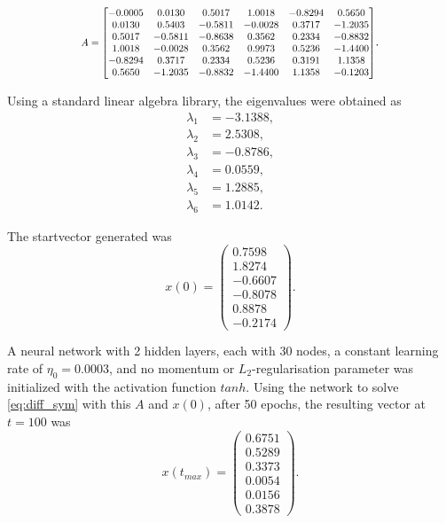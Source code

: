 \documentclass[multicolumn, 10pt]{extarticle}
\begin{document}
\newcommand\scalemath[2]{\scalebox{#1}{\mbox{\ensuremath{\displaystyle #2}}}}

\begin{equation*}
	\scalemath{0.8}{
		A = \begin{bmatrix}
			-0.0005 & 0.0130  & 0.5017  & 1.0018  & -0.8294 & 0.5650  \\
			0.0130  & 0.5403  & -0.5811 & -0.0028 & 0.3717  & -1.2035 \\
			0.5017  & -0.5811 & -0.8638 & 0.3562  & 0.2334  & -0.8832 \\
			1.0018  & -0.0028 & 0.3562  & 0.9973  & 0.5236  & -1.4400 \\
			-0.8294 & 0.3717  & 0.2334  & 0.5236  & 0.3191  & 1.1358  \\
			0.5650  & -1.2035 & -0.8832 & -1.4400 & 1.1358  & -0.1203 \\
		\end{bmatrix}}.
\end{equation*}

Using a standard linear algebra library, the eigenvalues were obtained as
\begin{align*}
	\lambda_1 & = -3.1388, \\
	\lambda_2 & = 2.5308,  \\
	\lambda_3 & = -0.8786, \\
	\lambda_4 & = 0.0559,  \\
	\lambda_5 & = 1.2885,  \\
	\lambda_6 & = 1.0142.
\end{align*}

The startvector generated was
\begin{equation*}
	x(0) = \begin{pmatrix}
		0.7598  \\
		1.8274  \\
		-0.6607 \\
		-0.8078 \\
		0.8878  \\
		-0.2174
	\end{pmatrix}.
\end{equation*}

A neural network with 2 hidden layers, each with 30 nodes, a constant learning rate of $\eta_0=0.0003$, and no momentum or $L_2$-regularisation parameter was initialized with the activation function $tanh$. Using the network to solve \eqref{eq:diff_sym} with this $A$ and $x(0)$, after 50 epochs, the resulting vector at $t=100$ was
\begin{equation*}
	x(t_{max}) = \begin{pmatrix}
		0.6751 \\
		0.5289 \\
		0.3373 \\
		0.0054 \\
		0.0156 \\
		0.3878
	\end{pmatrix}.
\end{equation*}
\end{document}
